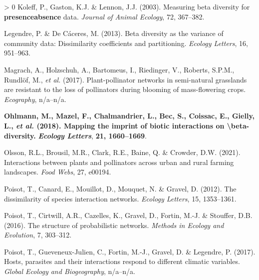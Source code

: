 \documentclass[11pt]{article}
\makeatletter
\def\maxwidth{\ifdim\Gin@nat@width>\linewidth\linewidth
\else\Gin@nat@width\fi}
\let\Oldincludegraphics\includegraphics
\renewcommand{\includegraphics}[1]{\Oldincludegraphics[width=\maxwidth]{#1}}
\newlength{\cslhangindent}
\newenvironment{CSLReferences}[3] %
 {%
  \setlength{\parindent}{0pt}
  \ifodd #1 \everypar{\setlength{\hangindent}{\cslhangindent}}\ignorespaces\fi
  \ifnum #2 > 0
  \setlength{\parskip}{#2\baselineskip}
  \fi
 }%
 {}
\providecommand{\DIFaddtex}[1]{{\bf #1}} %
\providecommand{\DIFdeltex}[1]{} %
\providecommand{\DIFaddbegin}{\protect\color{blue}} %
\providecommand{\DIFaddend}{\protect\color{black}} %
\providecommand{\DIFdelbegin}{\protect\color{red}} %
\providecommand{\DIFdelend}{\protect\color{black}} %
\providecommand{\DIFadd}[1]{\texorpdfstring{\DIFaddtex{#1}}{#1}} %
\providecommand{\DIFdel}[1]{\texorpdfstring{\DIFdeltex{#1}}{}} %
\newcommand{\DIFscaledelfig}{0.5}
\newlength{\DIFdelgraphicswidth} %
\newlength{\DIFdelgraphicsheight} %
\newcommand{\DIFaddincludegraphics}[2][]{{\color{blue}\fbox{\DIFOincludegraphics[#1]{#2}}}} %
\newcommand{\DIFdelincludegraphics}[2][]{%
\sbox{\DIFdelgraphicsbox}{\DIFOincludegraphics[#1]{#2}}%
\settoboxwidth{\DIFdelgraphicswidth}{\DIFdelgraphicsbox} %
\settoboxtotalheight{\DIFdelgraphicsheight}{\DIFdelgraphicsbox} %
\scalebox{\DIFscaledelfig}{%
\parbox[b]{\DIFdelgraphicswidth}{\usebox{\DIFdelgraphicsbox}\\[-\baselineskip] \rule{\DIFdelgraphicswidth}{0em}}\llap{\resizebox{\DIFdelgraphicswidth}{\DIFdelgraphicsheight}{%
\setlength{\unitlength}{\DIFdelgraphicswidth}%
\begin{picture}(1,1)%
\thicklines\linethickness{2pt} %
{\color[rgb]{1,0,0}\put(0,0){\framebox(1,1){}}}%
{\color[rgb]{1,0,0}\put(0,0){\line( 1,1){1}}}%
{\color[rgb]{1,0,0}\put(0,1){\line(1,-1){1}}}%
\end{picture}%
}\hspace*{3pt}}} %
} %
\DeclareRobustCommand{\DIFaddbegin}{\DIFOaddbegin \let\includegraphics\DIFaddincludegraphics} %
\DeclareRobustCommand{\DIFaddend}{\DIFOaddend \let\includegraphics\DIFOincludegraphics} %
\DeclareRobustCommand{\DIFdelbegin}{\DIFOdelbegin \let\includegraphics\DIFdelincludegraphics} %
\DeclareRobustCommand{\DIFdelend}{\DIFOaddend \let\includegraphics\DIFOincludegraphics} %
\makeatother
\begin{document}
\begin{CSLReferences}{1}{0}
\leavevmode\hypertarget{ref-Koleff2003MeaBet}{}%
Koleff, P., Gaston, K.J. \& Lennon, J.J. (2003). Measuring beta
diversity for \DIFdelbegin \DIFdel{presence--absence }\DIFdelend \DIFaddbegin \DIFadd{presenceabsence }\DIFaddend data. \emph{Journal of Animal Ecology},
72, 367--382.

\leavevmode\hypertarget{ref-Legendre2013BetDiv}{}%
Legendre, P. \& De Cáceres, M. (2013). Beta diversity as the variance of
community data: Dissimilarity coefficients and partitioning.
\emph{Ecology Letters}, 16, 951--963.

\leavevmode\hypertarget{ref-Magrach2017PlaNet}{}%
Magrach, A., Holzschuh, A., Bartomeus, I., Riedinger, V., Roberts,
S.P.M., Rundlöf, M., \emph{et al.} (2017). Plant-pollinator networks in
semi-natural grasslands are resistant to the loss of pollinators during
blooming of mass-flowering crops. \emph{Ecography}, n/a--n/a.

\leavevmode\DIFdelbegin %
\DIFdelend \DIFaddbegin \hypertarget{ref-Ohlmann2018MapImp}{}\DIFaddend %
\DIFdelbegin \DIFdel{Novotny, V.(2009). Beta diversity of plant--insect food webs in
tropical forests: A conceptual framework. }\DIFdelend \DIFaddbegin \DIFadd{Ohlmann, M., Mazel, F., Chalmandrier, L., Bec, S., Coissac, E., Gielly,
L., \emph{et al.} (2018). Mapping the imprint of biotic interactions on
\textbackslash beta-diversity. }\DIFaddend \emph{\DIFdelbegin \DIFdel{Insect Conservation and
Diversity}\DIFdelend \DIFaddbegin \DIFadd{Ecology Letters}\DIFaddend }, \DIFdelbegin \DIFdel{2, 5--9}\DIFdelend \DIFaddbegin \DIFadd{21, 1660--1669}\DIFaddend .

\leavevmode\hypertarget{ref-Olsson2021IntPla}{}%
Olsson, R.L., Brousil, M.R., Clark, R.E., Baine, Q. \& Crowder, D.W.
(2021). Interactions between plants and pollinators across urban and
rural farming landscapes. \emph{Food Webs}, 27, e00194.

\leavevmode\hypertarget{ref-Poisot2012DisSpe}{}%
Poisot, T., Canard, E., Mouillot, D., Mouquet, N. \& Gravel, D. (2012).
The dissimilarity of species interaction networks. \emph{Ecology
Letters}, 15, 1353--1361.

\leavevmode\hypertarget{ref-Poisot2016StrPro}{}%
Poisot, T., Cirtwill, A.R., Cazelles, K., Gravel, D., Fortin, M.-J. \&
Stouffer, D.B. (2016). The structure of probabilistic networks.
\emph{Methods in Ecology and Evolution}, 7, 303--312.

\leavevmode\hypertarget{ref-Poisot2017HosPar}{}%
Poisot, T., Gueveneux-Julien, C., Fortin, M.-J., Gravel, D. \& Legendre,
P. (2017). Hosts, parasites and their interactions respond to different
climatic variables. \emph{Global Ecology and Biogeography}, n/a--n/a.


\end{CSLReferences}
\end{document}
